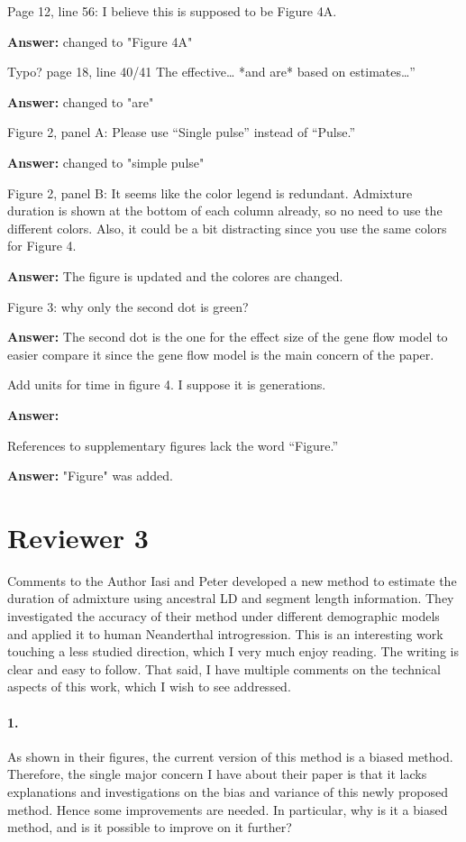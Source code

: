 \documentclass[11pt]{article}
\let\oldparagraph\paragraph
\renewcommand{\paragraph}[1]{\oldparagraph{#1}\mbox{}}
\begin{document}
Page 12, line 56: I believe this is supposed to be Figure 4A. 

\textbf{Answer:} changed to "Figure 4A"

Typo? page 18, line 40/41 The effective… *and are* based on estimates…” 

\textbf{Answer:} changed to "are"

Figure 2, panel A: Please use “Single pulse” instead of “Pulse.”

\textbf{Answer:} changed to "simple pulse"


Figure 2, panel B: It seems like the color legend is redundant. Admixture duration is shown at the bottom of each column already, so no need to use the different colors. Also, it could be a bit distracting since you use the same colors for Figure 4. 

\textbf{Answer:} The figure is updated and the colores are changed.

Figure 3: why only the second dot is green?

\textbf{Answer:} The second dot is the one for the effect size of the gene flow model to easier compare it since the gene flow model is the main concern of the paper.

Add units for time in figure 4. I suppose it is generations.

\textbf{Answer:} 

References to supplementary figures lack the word “Figure.” 

\textbf{Answer:} "Figure" was added.

\section{Reviewer 3}\label{Reviewer 3}

Comments to the Author
Iasi and Peter developed a new method to estimate the duration of admixture using ancestral LD and segment length information. They investigated the accuracy of their method under different demographic models and applied it to human Neanderthal introgression. This is an interesting work touching a less studied direction, which I very much enjoy reading. The writing is clear and easy to follow. That said, I have multiple comments on the technical aspects of this work, which I wish to see addressed. 

\paragraph{1.}
As shown in their figures, the current version of this method is a biased method. Therefore, the single major concern I have about their paper is that it lacks explanations and investigations on the bias and variance of this newly proposed method. Hence some improvements are needed. In particular, why is it a biased method, and is it possible to improve on it further?
\end{document}
